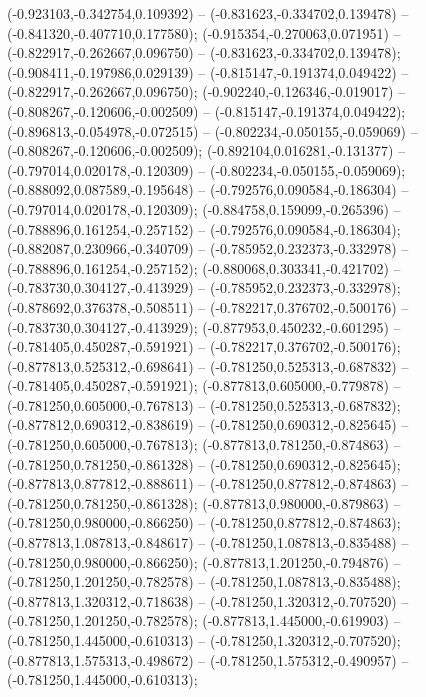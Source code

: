  (-0.923103,-0.342754,0.109392) -- (-0.831623,-0.334702,0.139478) -- (-0.841320,-0.407710,0.177580);
 (-0.915354,-0.270063,0.071951) -- (-0.822917,-0.262667,0.096750) -- (-0.831623,-0.334702,0.139478);
 (-0.908411,-0.197986,0.029139) -- (-0.815147,-0.191374,0.049422) -- (-0.822917,-0.262667,0.096750);
 (-0.902240,-0.126346,-0.019017) -- (-0.808267,-0.120606,-0.002509) -- (-0.815147,-0.191374,0.049422);
 (-0.896813,-0.054978,-0.072515) -- (-0.802234,-0.050155,-0.059069) -- (-0.808267,-0.120606,-0.002509);
 (-0.892104,0.016281,-0.131377) -- (-0.797014,0.020178,-0.120309) -- (-0.802234,-0.050155,-0.059069);
 (-0.888092,0.087589,-0.195648) -- (-0.792576,0.090584,-0.186304) -- (-0.797014,0.020178,-0.120309);
 (-0.884758,0.159099,-0.265396) -- (-0.788896,0.161254,-0.257152) -- (-0.792576,0.090584,-0.186304);
 (-0.882087,0.230966,-0.340709) -- (-0.785952,0.232373,-0.332978) -- (-0.788896,0.161254,-0.257152);
 (-0.880068,0.303341,-0.421702) -- (-0.783730,0.304127,-0.413929) -- (-0.785952,0.232373,-0.332978);
 (-0.878692,0.376378,-0.508511) -- (-0.782217,0.376702,-0.500176) -- (-0.783730,0.304127,-0.413929);
 (-0.877953,0.450232,-0.601295) -- (-0.781405,0.450287,-0.591921) -- (-0.782217,0.376702,-0.500176);
 (-0.877813,0.525312,-0.698641) -- (-0.781250,0.525313,-0.687832) -- (-0.781405,0.450287,-0.591921);
 (-0.877813,0.605000,-0.779878) -- (-0.781250,0.605000,-0.767813) -- (-0.781250,0.525313,-0.687832);
 (-0.877812,0.690312,-0.838619) -- (-0.781250,0.690312,-0.825645) -- (-0.781250,0.605000,-0.767813);
 (-0.877813,0.781250,-0.874863) -- (-0.781250,0.781250,-0.861328) -- (-0.781250,0.690312,-0.825645);
 (-0.877813,0.877812,-0.888611) -- (-0.781250,0.877812,-0.874863) -- (-0.781250,0.781250,-0.861328);
 (-0.877813,0.980000,-0.879863) -- (-0.781250,0.980000,-0.866250) -- (-0.781250,0.877812,-0.874863);
 (-0.877813,1.087813,-0.848617) -- (-0.781250,1.087813,-0.835488) -- (-0.781250,0.980000,-0.866250);
 (-0.877813,1.201250,-0.794876) -- (-0.781250,1.201250,-0.782578) -- (-0.781250,1.087813,-0.835488);
 (-0.877813,1.320312,-0.718638) -- (-0.781250,1.320312,-0.707520) -- (-0.781250,1.201250,-0.782578);
 (-0.877813,1.445000,-0.619903) -- (-0.781250,1.445000,-0.610313) -- (-0.781250,1.320312,-0.707520);
 (-0.877813,1.575313,-0.498672) -- (-0.781250,1.575312,-0.490957) -- (-0.781250,1.445000,-0.610313);
